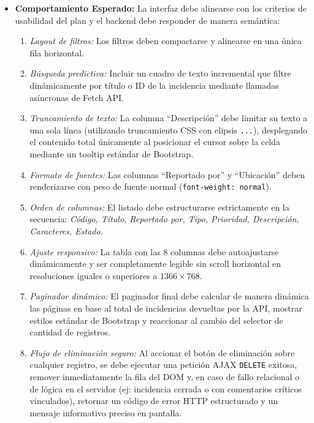 \begin{itemize}
    \item \textbf{Comportamiento Esperado:}
    La interfaz debe alinearse con los criterios de usabilidad del plan y el backend debe responder de manera semántica:
    \begin{enumerate}
        \item \textit{Layout de filtros:} Los filtros deben compactarse y alinearse en una única fila horizontal.
        \item \textit{Búsqueda predictiva:} Incluir un cuadro de texto incremental que filtre dinámicamente por título o ID de la incidencia mediante llamadas asíncronas de Fetch API.
        \item \textit{Truncamiento de texto:} La columna ``Descripción'' debe limitar su texto a una sola línea (utilizando truncamiento CSS con elipsis \texttt{...}), desplegando el contenido total únicamente al posicionar el cursor sobre la celda mediante un tooltip estándar de Bootstrap.
        \item \textit{Formato de fuentes:} Las columnas ``Reportado por'' y ``Ubicación'' deben renderizarse con peso de fuente normal (\texttt{font-weight: normal}).
        \item \textit{Orden de columnas:} El listado debe estructurarse estrictamente en la secuencia: \textit{Código, Título, Reportado por, Tipo, Prioridad, Descripción, Caracteres, Estado}.
        \item \textit{Ajuste responsivo:} La tabla con las 8 columnas debe autoajustarse dinámicamente y ser completamente legible sin scroll horizontal en resoluciones iguales o superiores a $1366\times768$.
        \item \textit{Paginador dinámico:} El paginador final debe calcular de manera dinámica las páginas en base al total de incidencias devueltas por la API, mostrar estilos estándar de Bootstrap y reaccionar al cambio del selector de cantidad de registros.
        \item \textit{Flujo de eliminación seguro:} Al accionar el botón de eliminación sobre cualquier registro, se debe ejecutar una petición AJAX \texttt{DELETE} exitosa, remover inmediatamente la fila del DOM y, en caso de fallo relacional o de lógica en el servidor (ej: incidencia cerrada o con comentarios críticos vinculados), retornar un código de error HTTP estructurado y un mensaje informativo preciso en pantalla.
    \end{enumerate}
    

\end{itemize}
